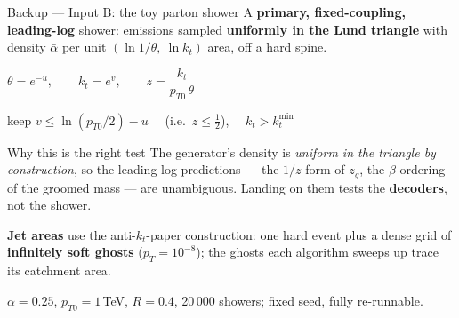 \documentclass[aspectratio=169,10pt]{beamer}
\newcommand{\smallnote}[1]{{\footnotesize\color{fjgray} #1}}
\begin{document}
\begin{frame}{Backup --- Input B: the toy parton shower}
A \textbf{primary, fixed-coupling, leading-log} shower: emissions sampled
\textbf{uniformly in the Lund triangle} with density $\bar\alpha$ per unit
$(\ln 1/\theta,\ \ln k_t)$ area, off a hard spine.
\medskip

\begin{center}
$\theta = e^{-u}, \qquad k_t = e^{v}, \qquad z = \dfrac{k_t}{p_{T0}\,\theta}$
\smallskip

keep $v \le \ln(p_{T0}/2) - u$ \ \ (i.e.\ $z\le\tfrac12$), \ \ $k_t > k_t^{\min}$
\end{center}
\medskip

\begin{block}{Why this is the right test}
\small The generator's density is \emph{uniform in the triangle by construction},
so the leading-log predictions --- the $1/z$ form of $z_g$, the $\beta$-ordering
of the groomed mass --- are unambiguous. Landing on them tests the
\textbf{decoders}, not the shower.
\end{block}
\medskip

\textbf{Jet areas} use the anti-$k_t$-paper construction: one hard event plus a
dense grid of \textbf{infinitely soft ghosts} ($p_T=10^{-8}$); the ghosts each
algorithm sweeps up trace its catchment area.
\smallskip

\smallnote{$\bar\alpha = 0.25$, $p_{T0} = 1$\,TeV, $R = 0.4$, 20\,000 showers;
fixed seed, fully re-runnable.}
\end{frame}
\end{document}
